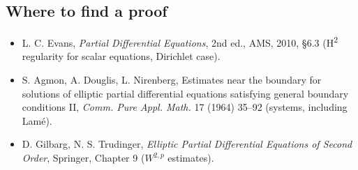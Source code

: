 \subsection*{Where to find a proof}

\begin{itemize}
\item L. C. Evans, \emph{Partial Differential Equations}, 2nd ed., AMS, 2010, §6.3 (H\textsuperscript{2} regularity for scalar equations, Dirichlet case).
\item S. Agmon, A. Douglis, L. Nirenberg, Estimates near the boundary for solutions of elliptic partial differential equations satisfying general boundary conditions II, \emph{Comm. Pure Appl. Math.} 17 (1964) 35--92 (systems, including Lamé).
\item D. Gilbarg, N. S. Trudinger, \emph{Elliptic Partial Differential Equations of Second Order}, Springer, Chapter 9 ($W^{2,p}$ estimates).
\end{itemize}

\neededfor
